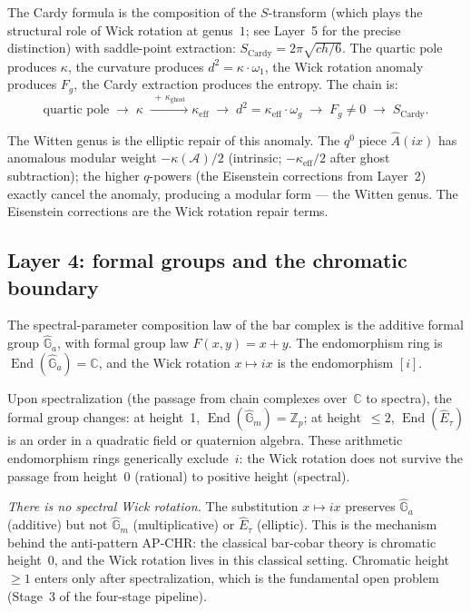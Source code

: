 \documentclass[11pt]{article}
\newcommand{\cA}{\mathcal{A}}
\newcommand{\C}{\mathbb{C}}
\newcommand{\Z}{\mathbb{Z}}
\newcommand{\End}{\operatorname{End}}
\begin{document}
The Cardy formula is the composition of the $S$-transform
(which plays the structural role of Wick rotation at genus~$1$;
see Layer~5 for the precise distinction) with saddle-point extraction:
$S_{\mathrm{Cardy}} = 2\pi\sqrt{ch/6}$.  The quartic pole
produces $\kappa$, the curvature produces $d^2 = \kappa \cdot \omega_1$,
the Wick rotation anomaly produces $F_g$, the Cardy extraction
produces the entropy.  The chain is:
\[
\text{quartic pole}
\;\longrightarrow\;
\kappa
\;\xrightarrow{\;+\,\kappa_{\mathrm{ghost}}\;}
\kappa_{\mathrm{eff}}
\;\longrightarrow\;
d^2 = \kappa_{\mathrm{eff}} \cdot \omega_g
\;\longrightarrow\;
F_g \ne 0
\;\longrightarrow\;
S_{\mathrm{Cardy}}.
\]

The Witten genus is the elliptic repair of this anomaly.
The $q^0$ piece $\hat{A}(ix)$ has anomalous modular weight
$-\kappa(\cA)/2$ (intrinsic; $-\kappa_{\mathrm{eff}}/2$ after
ghost subtraction); the higher $q$-powers (the Eisenstein corrections
from Layer~2) exactly cancel the anomaly, producing a
modular form --- the Witten genus.  The Eisenstein corrections
are the Wick rotation repair terms.

\subsection{Layer 4: formal groups and the chromatic boundary}

The spectral-parameter composition law of the bar complex is
the additive formal group $\hat{\mathbb{G}}_a$, with formal
group law $F(x,y) = x + y$.  The endomorphism ring is
$\End(\hat{\mathbb{G}}_a) = \C$, and the Wick rotation
$x \mapsto ix$ is the endomorphism $[i]$.

Upon spectralization (the passage from chain complexes over~$\C$
to spectra), the formal group changes:
at height~1, $\End(\hat{\mathbb{G}}_m) = \Z_p$;
at height~$\le 2$, $\End(\hat{E}_\tau)$ is an order in a
quadratic field or quaternion algebra.  These arithmetic
endomorphism rings generically exclude~$i$:
the Wick rotation does not survive the passage from
height~$0$ (rational) to positive height (spectral).

\emph{There is no spectral Wick rotation.}  The substitution
$x \mapsto ix$ preserves $\hat{\mathbb{G}}_a$ (additive) but not
$\hat{\mathbb{G}}_m$ (multiplicative) or $\hat{E}_\tau$ (elliptic).
This is the mechanism behind the anti-pattern AP-CHR: the classical
bar-cobar theory is chromatic height~$0$, and the Wick rotation lives
in this classical setting.  Chromatic height~$\ge 1$ enters only after
spectralization, which is the fundamental open problem (Stage~3 of
the four-stage pipeline).
\end{document}
